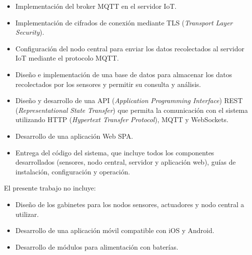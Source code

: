 \begin{itemize}
	\item Implementación del broker MQTT en el servidor IoT.
	\item Implementación de cifrados de conexión mediante TLS (\textit{Transport Layer
		      Security}).
	\item Configuración del nodo central para enviar los datos recolectados al servidor
	      IoT mediante el protocolo MQTT.
	\item Diseño e implementación de una base de datos para almacenar los datos
	      recolectados por los sensores y permitir su consulta y análisis.
	\item Diseño y desarrollo de una API (\textit{Application Programming Interface})
	      REST (\textit{Representational State Transfer}) que permita la comunicación con
	      el sistema utilizando HTTP (\textit{Hypertext Transfer Protocol}), MQTT y
	      WebSockets.
	\item Desarrollo de una aplicación Web SPA.
	\item Entrega del código del sistema, que incluye todos los componentes desarrollados
	      (sensores, nodo central, servidor y aplicación web), guías de instalación,
	      configuración y operación.
\end{itemize}

El presente trabajo no incluye:
\begin{itemize}
	\item Diseño de los gabinetes para los nodos sensores, actuadores y nodo central a
	      utilizar.
	\item Desarrollo de una aplicación móvil compatible con iOS y Android.
	\item Desarrollo de módulos para alimentación con baterías.
\end{itemize}